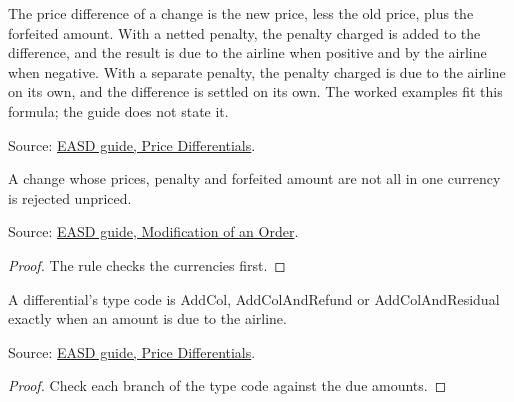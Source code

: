 \begin{definition}
  \label{def:change-cancellation-due-amounts}
  The price difference of a change is the new price, less the old price, plus
  the forfeited amount.  With a netted penalty, the penalty charged is added
  to the difference, and the result is due to the airline when positive and
  by the airline when negative.  With a separate penalty, the penalty charged
  is due to the airline on its own, and the difference is settled on its own.
  The worked examples fit this formula; the guide does not state it.

  Source: \href{https://standards.atlassian.net/wiki/spaces/EASD/pages/574554213/Price+Differentials}{EASD guide, Price Differentials}.
\end{definition}

\begin{theorem}
  \label{thm:change-cancellation-mixed-currency}
  A change whose prices, penalty and forfeited amount are not all in one
  currency is rejected unpriced.

  Source: \href{https://standards.atlassian.net/wiki/spaces/EASD/pages/574619782/Modification+of+an+Order}{EASD guide, Modification of an Order}.
\end{theorem}
\begin{proof}
  The rule checks the currencies first.
\end{proof}

\begin{theorem}
  \label{thm:change-cancellation-type-collects}
  A differential's type code is AddCol, AddColAndRefund or AddColAndResidual
  exactly when an amount is due to the airline.

  Source: \href{https://standards.atlassian.net/wiki/spaces/EASD/pages/574554213/Price+Differentials}{EASD guide, Price Differentials}.
\end{theorem}
\begin{proof}
  Check each branch of the type code against the due amounts.
\end{proof}

